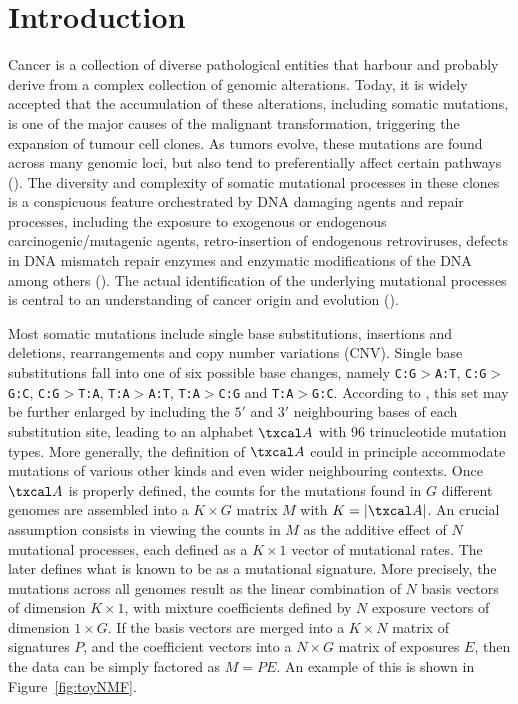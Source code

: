 \documentclass{bioinfo}
\begin{document}
\section{Introduction}
Cancer is a collection of diverse pathological entities that harbour
and probably derive from a complex collection of genomic
alterations. Today, it is widely accepted that the accumulation of
these alterations, including somatic mutations, is one of the major
causes of the malignant transformation, triggering the expansion of
tumour cell clones. As tumors evolve, these mutations are found across
many genomic loci, but also tend to preferentially affect certain
pathways (\citealp{CCSS}). The diversity and complexity of somatic
mutational processes in these clones is a conspicuous feature
orchestrated by DNA damaging agents and repair processes, including
the exposure to exogenous or endogenous carcinogenic/mutagenic agents,
retro-insertion of endogenous retroviruses, defects in DNA mismatch
repair enzymes and enzymatic modifications of the DNA among others
(\citealp{RG}). The actual identification of the underlying mutational
processes is central to an understanding of cancer origin and
evolution (\citealp{ANat, AS, HEN, RG}).


Most somatic mutations include single base substitutions,
insertions and deletions, rearrangements and copy number variations
(CNV). Single base substitutions fall into one of six possible base
changes, namely \texttt{C:G}$>$\texttt{A:T},
\texttt{C:G}$>$\texttt{G:C}, \texttt{C:G}$>$\texttt{T:A},
\texttt{T:A}$>$\texttt{A:T}, \texttt{T:A}$>$\texttt{C:G} and
\texttt{T:A}$>$\texttt{G:C}. According to \cite{A}, this set may be
further enlarged by including the $5'$ and $3'$ neighbouring bases of
each substitution site, leading to an alphabet $\txcal A$ with 96
trinucleotide mutation types. More generally, the definition of
$\txcal A$ could in principle accommodate mutations of various other
kinds
and even wider neighbouring contexts. Once $\txcal A$
is properly defined, the counts for the mutations found in $G$
different genomes are assembled into a $K\times G$ matrix $M$ with $K
= |\txcal A|$. An crucial assumption consists in viewing the counts
in $M$ as the additive effect of $N$ mutational processes, each
defined as a $K\times 1$ vector of mutational rates. The later defines
what is known to be as a mutational signature. More precisely, the
mutations across all genomes result as the linear combination of $N$
basis vectors of dimension $K\times 1$, with mixture coefficients
defined by $N$ exposure vectors of dimension $1 \times G$. If the
basis vectors are merged into a $K\times N$ matrix of signatures $P$,
and the coefficient vectors into a $N\times G$ matrix of exposures
$E$, then the data can be simply factored as $M=PE$. An example of
this is shown in Figure~\ref{fig:toyNMF}. 
\end{document}
